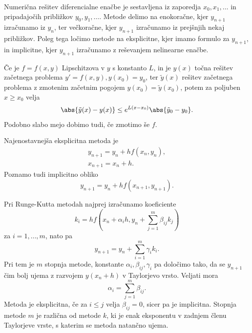 
Numerična rešitev diferencialne enačbe je sestavljena iz zaporedja $x_0, x_1,
\ldots$ in pripadajočih približkov $y_0, y_1, \ldots$.
Metode delimo na enokoračne, kjer $y_{n+1}$ izračunamo iz $y_n$, ter večkoračne,
kjer $y_{n+1}$ izračunamo iz prejšnjih nekaj približkov.
Poleg tega ločimo metode na eksplicitne, kjer imamo formulo za $y_{n+1}$, in
implicitne, kjer $y_{n+1}$ izračunamo z reševanjem nelinearne enačbe.

Če je $f = f(x, y)$ Lipschitzova v $y$ s konstanto $L$, in je $y(x)$ točna
rešitev začetnega problema $y' = f(x,y), y(x_0) = y_0$, ter $\tilde{y}(x)$
rešitev začetnega problema z zmotenim začetnim pogojem $y(x_0) =
\tilde{y}(x_0)$, potem za poljuben $x \ge x_0$ velja
\[
  \abs{\tilde{y}(x) - y(x)} \le e^{L (x-x_0)} \abs{\tilde{y}_0 - y_0}.
\]
Podobno slabo mejo dobimo tudi, če zmotimo še $f$.

Najenostavnejša eksplicitna metoda je 
\begin{gather*}
  y_{n+1} = y_n + h f(x_n, y_n), \\
  x_{n+1} = x_n + h.
\end{gather*}
Poznamo tudi implicitno obliko
\[
  y_{n+1} = y_n + h f(x_{n+1}, y_{n+1}).
\]


Pri Runge-Kutta metodah najprej izračunamo koeficiente
\[
  k_i = h f\left(x_n + \alpha_i h, y_n + \sum_{j=1}^m \beta_{ij} k_j\right)
\]
za $i = 1, \ldots, m$, nato pa
\[
  y_{n+1} = y_n + \sum_{i=1}^m \gamma_i k_i.
\]
Pri tem je $m$ stopnja metode, konstante $\alpha_i, \beta_{ij}, \gamma_i$ pa
določimo tako, da se $y_{n+1}$ čim bolj ujema z razvojem $y(x_n + h)$ v
Taylorjevo vrsto.
Veljati mora
\[
  \alpha_i = \sum_{j=1}^m \beta_{ij}.
\]
Metoda je eksplicitna, če za $i \le j$ velja $\beta_{ij} = 0$, sicer pa je
implicitna.
Stopnja metode $m$ je različna od  metode $k$, ki je enak eksponentu
v zadnjem členu Taylorjeve vrste, s katerim se metoda natančno ujema.




